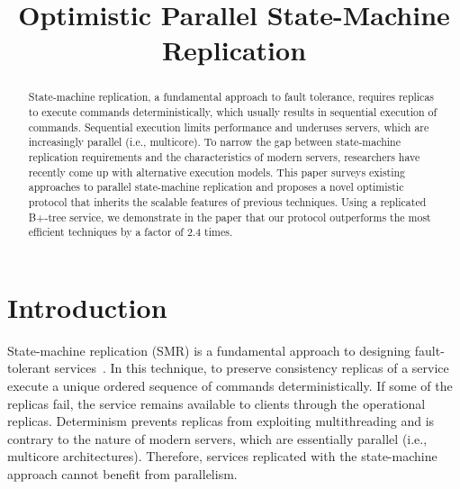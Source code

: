 \documentclass[conference]{IEEEtran}
\begin{document}
\title{Optimistic Parallel State-Machine Replication}


\author{
\and
{}
}


\maketitle


\begin{abstract}
State-machine replication, a fundamental approach to fault tolerance, requires replicas to execute commands deterministically, which usually results in sequential execution of commands.
Sequential execution limits performance and underuses servers, which are increasingly parallel (i.e., multicore).
To narrow the gap between state-machine replication requirements and the characteristics of modern servers, researchers have recently come up with alternative execution models.
This paper surveys existing approaches to parallel state-machine replication and proposes a novel optimistic protocol that inherits the scalable features of previous techniques.
Using a replicated B+-tree service, we demonstrate in the paper that our protocol outperforms the most efficient techniques by a factor of 2.4 times. 

\end{abstract}


\IEEEpeerreviewmaketitle


\section{Introduction}
\label{sec:intro}

State-machine replication (SMR) is a fundamental approach to designing fault-tolerant services~\cite{Lam78, Sch90}. 
In this technique, to preserve consistency replicas of a service execute a unique ordered sequence of commands deterministically. 
If some of the replicas fail, the service remains available to clients through the operational replicas. 
Determinism prevents replicas from exploiting multithreading and is contrary to the nature of modern servers, which are essentially parallel (i.e., multicore architectures).
Therefore, services replicated with the state-machine approach cannot benefit from parallelism. 
\end{document}
